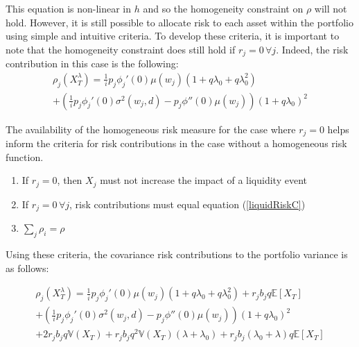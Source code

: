 \documentclass[12pt]{article}
\theoremstyle{definition}
\begin{document}
This equation is non-linear in \(h\) and so the homogeneity constraint on \(\rho\) will not hold.  However, it is still possible to allocate risk to each asset within the portfolio using simple and intuitive criteria.  To develop these criteria, it is important to note that the homogeneity constraint does still hold if \(r_j=0\,\forall j\).  Indeed, the risk contribution in this case is the following:
\begin{multline} \label{liquidRiskC}
 \rho_j(X_T ^ \lambda)=\frac{1}{i}p_j \phi_j '(0)\mu(w_j) \left(1+q\lambda_0  + q \lambda_0 ^2  \right) \\+\left(\frac{1}{i}p_j \phi_j '(0) \sigma^2(w_j, d)-p_j\phi''(0)   \mu(w_j) \right)(1+q \lambda_0)^2 
\end{multline}
 
 The availability of the homogeneous risk measure for the case where \(r_j=0\) helps inform the criteria for risk contributions in the case without a homogeneous risk function.  
\begin{enumerate}
\item If \(r_j=0\), then \(X_j\) must not increase the impact of a liquidity event

\item  If \(r_j=0\,\forall j\), risk contributions must equal equation (\ref{liquidRiskC})
\item\( \sum_{j} \rho_i =\rho \)
\end{enumerate}

Using these criteria, the covariance risk contributions to the portfolio variance is as follows:

\begin{multline} \label{liquidityRiskContributions}
\rho_j(X_T ^ \lambda)=\frac{1}{i}p_j \phi_j '(0)\mu(w_j) \left(1+q\lambda_0  + q \lambda_0 ^2  \right)+r_j b_j q \mathbb{E}[X_T] \\+\left(\frac{1}{i}p_j \phi_j '(0) \sigma^2(w_j, d)-p_j\phi''(0)   \mu(w_j) \right)(1+q \lambda_0)^2 \\
+2 r_j b_j q \mathbb{V}(X_T)+r_j b_j q^2 \mathbb{V}(X_T)(\lambda+\lambda_0)+r_j b_j (\lambda_0+\lambda)q \mathbb{E}[X_T]
\end{multline}
\end{document}
